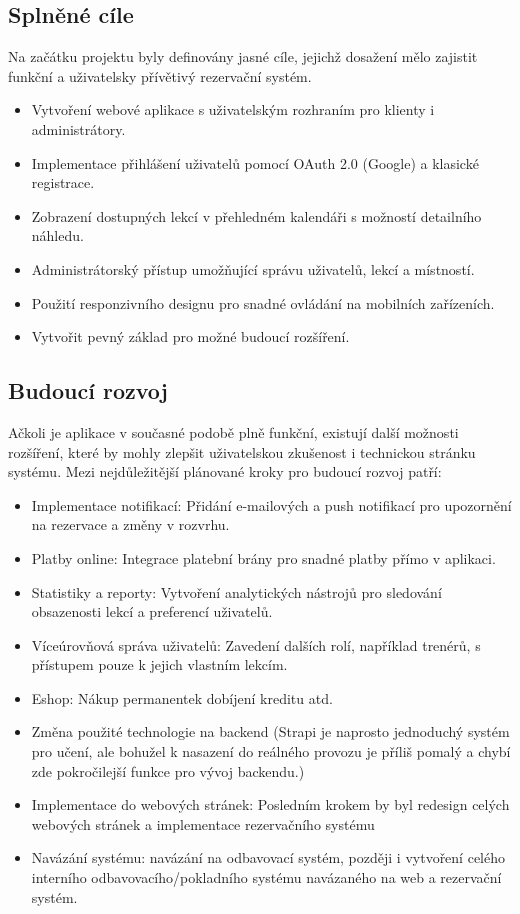 \documentclass[12pt, a4paper,
openright
]{report}
\begin{document}
\subsection{Splněné cíle}
Na začátku projektu byly definovány jasné cíle, jejichž dosažení mělo zajistit funkční a uživatelsky přívětivý rezervační systém.
\begin{itemize}
	\item Vytvoření webové aplikace s uživatelským rozhraním pro klienty i administrátory.
	\item Implementace přihlášení uživatelů pomocí OAuth 2.0 (Google) a klasické registrace.
    \item Zobrazení dostupných lekcí v přehledném kalendáři s možností detailního náhledu.
    \item Administrátorský přístup umožňující správu uživatelů, lekcí a místností.
    \item Použití responzivního designu pro snadné ovládání na mobilních zařízeních.
    \item Vytvořit pevný základ pro možné budoucí rozšíření.
\end{itemize}


\subsection{Budoucí rozvoj}
Ačkoli je aplikace v současné podobě plně funkční, existují další možnosti rozšíření, které by mohly zlepšit uživatelskou zkušenost i technickou stránku systému. Mezi nejdůležitější plánované kroky pro budoucí rozvoj patří:
\begin{itemize}
\item Implementace notifikací: Přidání e-mailových a push notifikací pro upozornění na rezervace a změny v rozvrhu.
\item Platby online: Integrace platební brány pro snadné platby přímo v aplikaci.
\item Statistiky a reporty: Vytvoření analytických nástrojů pro sledování obsazenosti lekcí a preferencí uživatelů.
\item Víceúrovňová správa uživatelů: Zavedení dalších rolí, například trenérů, s přístupem pouze k jejich vlastním lekcím.
\item Eshop: Nákup permanentek dobíjení kreditu atd.
\item Změna použité technologie na backend (Strapi je naprosto jednoduchý systém pro učení, ale bohužel k nasazení do reálného provozu je příliš pomalý a chybí zde pokročilejší funkce pro vývoj backendu.)
\item Implementace do webových stránek: Posledním krokem by byl redesign celých webových stránek a implementace rezervačního systému
\item Navázání systému: navázání na odbavovací systém, později i vytvoření celého interního odbavovacího/pokladního systému navázaného na web a rezervační systém.
\end{itemize}
\end{document}
